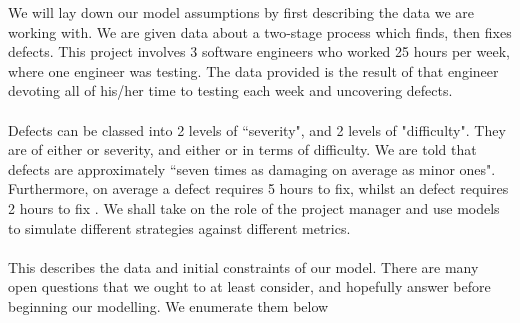 We will lay down our model assumptions by first describing the data we are working with.
We are given data about a two-stage process which finds, then fixes defects.
This project involves 3 software engineers who worked 25 hours per week, where one engineer was testing.
The data provided is the result of that engineer devoting all of his/her time to testing each
week and uncovering defects.\\
\\
Defects can be classed into 2 levels of ``severity", and 2 levels of "difficulty".
They are of either \major or \minor severity, and either \easy or \hard in terms of difficulty.
We are told that \major defects are approximately ``seven times as damaging on average as minor
ones".
Furthermore, on average a \hard defect requires 5 hours to fix, whilst an \easy defect requires 2
hours to fix \FIXME.
We shall take on the role of the project manager and use models to simulate different strategies against different
metrics.\\
\\
This describes the data and initial constraints of our model.
There are many open questions that we ought to at least consider, and hopefully answer before
beginning our modelling.
We enumerate them below
